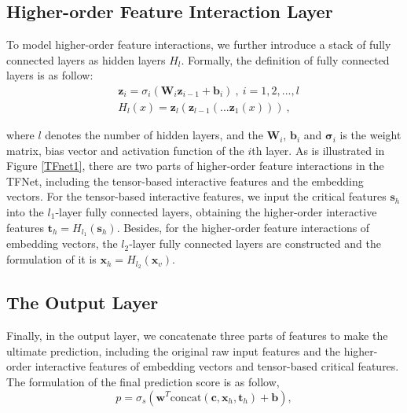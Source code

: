 \documentclass[sigconf]{acmart}
\begin{document}
\subsection{Higher-order Feature Interaction Layer}
To model higher-order feature interactions, we further introduce a stack of fully connected layers as hidden layers $H_l$. Formally, the definition of fully connected layers is as follow:
\begin{align}
&\mathbf{z}_{i} = \sigma _i(\mathbf{W}_{i}\mathbf{z}_{i-1}+\mathbf{b}_{i})~,~i=1,2,...,l \\ 
&H_{l}(x) = \mathbf{z}_{l}(\mathbf{z}_{l-1}(...\mathbf{z}_{1}(x)))~,
\end{align}

\noindent where $l$ denotes the number of hidden layers, and the $\mathbf{W}_{i}$, $\mathbf{b}_{i}$ and $\mathbf{\sigma}_{i}$ is the weight matrix, bias vector and activation function of the $i$th layer. 
As is illustrated in Figure \ref{TFnet1}, there are two parts of higher-order feature interactions in the TFNet, including the tensor-based interactive features and the embedding vectors. 
For the tensor-based interactive features, we input the critical features $\mathbf{s}_h$ into the $l_1$-layer fully connected layers, obtaining the higher-order interactive features $\mathbf{t}_h = H_{l_1}(\mathbf{s}_{h})$. Besides, for the higher-order feature interactions of embedding vectors, the $l_2$-layer fully connected layers are constructed and the formulation of it is $\mathbf{x}_h = H_{l_2}(\mathbf{x}_{v})$.


\subsection{The Output Layer}
Finally, in the output layer, we concatenate three parts of features to make the ultimate prediction, including the original raw input features and the higher-order interactive features of embedding vectors and tensor-based critical features. The formulation of the final prediction score is as follow,
\begin{equation}
p = \sigma_s (\mathbf{w}^T\text{concat}(\mathbf{c}, \mathbf{x}_h, \mathbf{t}_h)+\mathbf{b}),
\end{equation}
\end{document}
